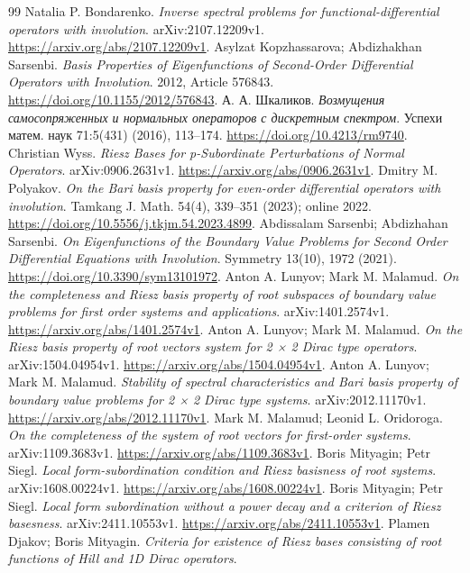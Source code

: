 \documentclass[12pt,a4paper]{article}
\begin{document}
\begin{thebibliography}{99}
Natalia P. Bondarenko. \emph{Inverse spectral problems for functional-differential operators with involution}.
arXiv:2107.12209v1. \url{https://arxiv.org/abs/2107.12209v1}.
Asylzat Kopzhassarova; Abdizhakhan Sarsenbi. \emph{Basis Properties of Eigenfunctions of Second-Order Differential Operators with Involution}.
2012, Article 576843. \url{https://doi.org/10.1155/2012/576843}.
А. А. Шкаликов. \emph{Возмущения самосопряженных и нормальных операторов с дискретным спектром}.
Успехи матем. наук 71:5(431) (2016), 113--174. \url{https://doi.org/10.4213/rm9740}.
Christian Wyss. \emph{Riesz Bases for p-Subordinate Perturbations of Normal Operators}.
arXiv:0906.2631v1. \url{https://arxiv.org/abs/0906.2631v1}.
Dmitry M. Polyakov. \emph{On the Bari basis property for even-order differential operators with involution}.
Tamkang J. Math. 54(4), 339--351 (2023); online 2022. \url{https://doi.org/10.5556/j.tkjm.54.2023.4899}.
Abdissalam Sarsenbi; Abdizhahan Sarsenbi. \emph{On Eigenfunctions of the Boundary Value Problems for Second Order Differential Equations with Involution}.
Symmetry 13(10), 1972 (2021). \url{https://doi.org/10.3390/sym13101972}.
Anton A. Lunyov; Mark M. Malamud. \emph{On the completeness and Riesz basis property of root subspaces of boundary value problems for first order systems and applications}.
arXiv:1401.2574v1. \url{https://arxiv.org/abs/1401.2574v1}.
Anton A. Lunyov; Mark M. Malamud. \emph{On the Riesz basis property of root vectors system for 2 × 2 Dirac type operators}.
arXiv:1504.04954v1. \url{https://arxiv.org/abs/1504.04954v1}.
Anton A. Lunyov; Mark M. Malamud. \emph{Stability of spectral characteristics and Bari basis property of boundary value problems for 2 × 2 Dirac type systems}.
arXiv:2012.11170v1. \url{https://arxiv.org/abs/2012.11170v1}.
Mark M. Malamud; Leonid L. Oridoroga. \emph{On the completeness of the system of root vectors for first-order systems}.
arXiv:1109.3683v1. \url{https://arxiv.org/abs/1109.3683v1}.
Boris Mityagin; Petr Siegl. \emph{Local form-subordination condition and Riesz basisness of root systems}.
arXiv:1608.00224v1. \url{https://arxiv.org/abs/1608.00224v1}.
Boris Mityagin; Petr Siegl. \emph{Local form subordination without a power decay and a criterion of Riesz basesness}.
arXiv:2411.10553v1. \url{https://arxiv.org/abs/2411.10553v1}.
Plamen Djakov; Boris Mityagin. \emph{Criteria for existence of Riesz bases consisting of root functions of Hill and 1D Dirac operators}.

\end{thebibliography}
\end{document}
